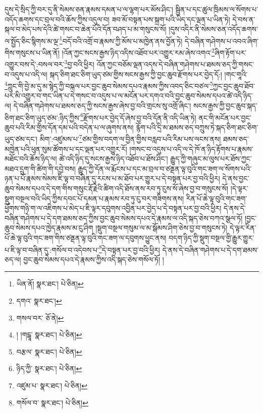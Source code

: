དུས་དེ་སྲིད་ཀྱི་བར་དུ་ནི་སེམས་ཅན་རྣམས་དམན་པ་ལ་ལྷག་པར་མོས་ཤིང་། སྦྱིན་པ་དང་ཚུལ་ཁྲིམས་ལ་སོགས་པ་འདོད་ཆགས་དང་བྲལ་བའི་ཆོས་ཀྱིས་འདུལ་བ། ཟབ་མོ་བསྟན་པས་སྐྲག་པའི་ཡིད་དང་ལྡན་པ་ཡིན་ཏེ། དེ་བས་ན་སྐལ་བ་མེད་པས་དེའི་ཚེ་གསང་བ་ཆེན་པོའི་དོན་བཤད་པ་མ་གསུངས་སོ། །དུས་འདིར་ནི་སེམས་ཅན་འདོད་ཆགས་ལ་སྤྱོད་ཅིང་སྙིགས་མ་ལྔ་\footnote{ཡིན་ནོ།   སྣར་ཐང་།  པེ་ཅིན། }བདོ་བའི་འགྲོ་བ་རྣམས་ཀྱི་མོས་པ་མཁྱེན་ནས་བྱོན་ཏེ། དེ་བཞིན་གཤེགས་པ་འབའ་ཞིག་གིས་གསུངས་པ་ཡིན་ནོ། །འོན་ཀྱང་སངས་རྒྱས་ཉིད་འདིས་འཐོབ་པར་འགྱུར་རམ་ཞེས་འགའ་\footnote{དགའ་  སྣར་ཐང་། }ཞིག་རྟོག་པར་འགྱུར་བས་དེ་:བསལ་བར་\footnote{གསལ་བར་  ཅོ་ནེ། }བྱ་བའི་ཕྱིར། འོན་ཀྱང་བཅོམ་ལྡན་འདས་དེ་བཞིན་གཤེགས་པ་ཐམས་ཅད་ཀྱི་གསང་བ་འདུས་པ་འདི་ལ། སྐད་ཅིག་ཐང་ཅིག་ཡུད་ཙམ་གྱིས་སངས་རྒྱས་ཀྱི་བྱང་ཆུབ་རྫོགས་པར་བྱེད་དོ:། །གང་གཱའི་\footnote{། །གངྒཱ་  སྣར་ཐང་།  པེ་ཅིན། }ཀླུང་གི་བྱེ་མ་དུ་མ་སྙེད་ཀྱི་བསྐལ་པར་བྱང་ཆུབ་སེམས་དཔའ་རྣམས་ཀྱིས་འབད་ཅིང་བཙལ་\footnote{བརྩལ་  སྣར་ཐང་།  པེ་ཅིན། }ཀྱང་བྱང་ཆུབ་ཐོབ་པར་མི་འགྱུར་བ་གང་ཡིན་པ་དེ་གསང་བ་འདུས་པ་ལ་མངོན་པར་དགའ་བའི་བྱང་ཆུབ་སེམས་དཔའ་ཚེ་འདི་ཉིད་ལ། དེ་བཞིན་གཤེགས་པ་ཐམས་ཅད་ཀྱི་སངས་རྒྱས་ཞེས་བྱ་བའི་གྲངས་སུ་འགྲོ་ཞིང་། སངས་རྒྱས་ཀྱི་བྱང་ཆུབ་སྐད་ཅིག་ཐང་ཅིག་ཡུད་ཙམ་:ཉིད་ཀྱིས་\footnote{ཉིད་ཀྱི་  སྣར་ཐང་།  པེ་ཅིན། }རྫོགས་པར་བྱེད་དོ་ཞེས་བྱ་བའི་དོན་ནི་འདི་ཡིན་ཏེ། ནང་གི་མངོན་པར་བྱང་ཆུབ་པའི་རིམ་གྱིས་དོན་དམ་པའི་བདེན་པ་ལ་ཞུགས་ནས། རྙོག་པའི་དྲི་མ་ཐམས་ཅད་བཀྲུས་ཏེ་སྐད་ཅིག་ཐང་ཅིག་ཡུད་ཙམ་དང་། མིག་:འཛུམས་པ་\footnote{འཛུམ་པ་  སྣར་ཐང་།  པེ་ཅིན། }ཙམ་གྱིས་བདག་ལ་བྱིན་གྱིས་བརླབ་པའི་རིམ་པས་ལངས་ནས། ཐམས་ཅད་མཁྱེན་པའི་ཕུན་སུམ་ཚོགས་པ་དང་ལྡན་པར་འགྱུར་རོ། །གསང་བ་འདུས་པ་འདི་ལ་དེ་ཁོ་ན་ཉིད་རྟོགས་པ་རྣམས་མཐོང་བའི་ཆོས་ཉིད་ལ། ཚེ་འདི་ཉིད་དུ་སངས་རྒྱས་ཉིད་འཐོབ་པ་ཐོས་ཤིང་། རྒྱུད་ཀྱི་གཞུང་མ་ལུས་པར་ཐོས་ཀྱང་མཐའ་དྲུག་གི་ཚིག་གི་དབྱེ་བས། རྒྱུད་ཀྱི་དོན་ལ་རྨོངས་པ་དང་མ་བྲལ་བ་ཙནྡན་ལྟ་བུའི་གང་ཟག་ལ་སོགས་པའི་ཉན་པ་པོ་རྣམས་སེམས་ཇི་ལྟ་བ་བཞིན་དུ་རངས་པ་མ་ཐོབ་པར་གྱུར་པ་དེ་བསྟན་པར་བྱ་བའི་ཕྱིར། དེ་ནས་བྱང་ཆུབ་སེམས་དཔའ་དེ་དག་གིས་གསུང་རྡོ་རྗེའི་ཚིག་འདི་ཐོས་ནས་རབ་ཏུ་ངུས་སོ་ཞེས་བྱ་བ་གསུངས་སོ། །དེ་ལྟར་སྡུག་བསྔལ་བའི་ཡིད་ཀྱིས་དབང་པོ་དམན་པ་རྣམས་རབ་ཏུ་ངུ་བར་གཟིགས་ནས། རིན་པོ་ཆེ་ལྟ་བུའི་གང་ཟག་ཕྱོགས་གཉི་ག་ལ་འཇིགས་པ་མེད་པ་ཇི་ལྟར་དབུགས་འབྱིན་པར་བྱེད་པ་དེ་བསྟན་པར་བྱ་བའི་ཕྱིར། དེ་ནས་དེ་བཞིན་གཤེགས་པ་དེ་དག་ཐམས་ཅད་ཀྱིས་བྱང་ཆུབ་སེམས་དཔའ་དེ་རྣམས་ལ་འདི་སྐད་ཅེས་བཀའ་སྩལ་ཏོ། །བྱང་ཆུབ་སེམས་དཔའ་ཁྱེད་རྣམས་མ་ངུ་ཤིག །སྡུག་བསྔལ་གསུམ་ལ་མ་སྒོམས་ཤིག་ཅེས་བྱ་བ་གསུངས་ཏེ། དེ་ལྟར་རིན་པོ་ཆེ་ལྟ་བུའི་གང་ཟག་གིས་ཙནྡན་ལྟ་བུའི་གང་ཟག་ལ་དབུགས་ཕྱུང་ནས། བདག་ཉིད་ཀྱི་སྡུག་བསྔལ་གྱི་རྒྱུར་གྱུར་པ་ཇི་ལྟ་བ་བཞིན་དུ་:གསོལ་བ་འདེབས་པ་\footnote{གསོལ་བ་  སྣར་ཐང་།  པེ་ཅིན། }དེ་བསྟན་པར་བྱ་བའི་ཕྱིར། དེ་ནས་དེ་བཞིན་གཤེགས་པ་དེ་དག་ཐམས་ཅད་ལ། བྱང་ཆུབ་སེམས་དཔའ་དེ་རྣམས་ཀྱིས་འདི་སྐད་ཅེས་གསོལ་ཏོ། །
